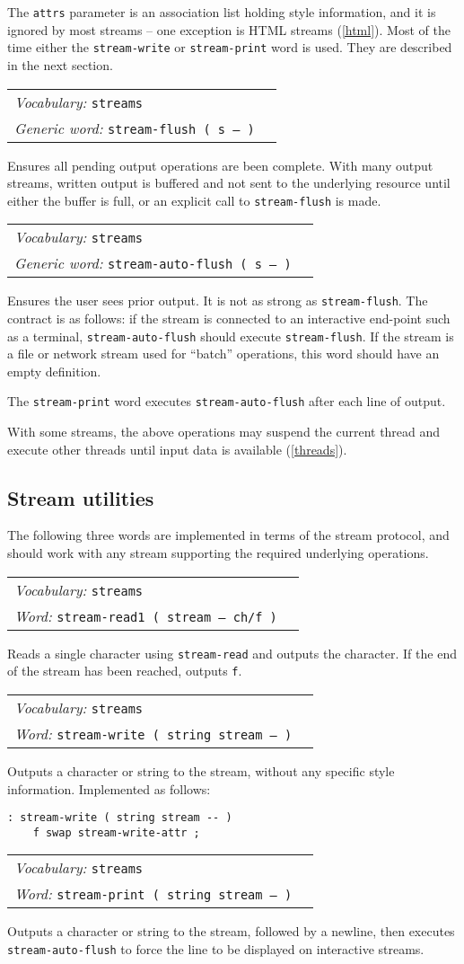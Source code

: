 \documentclass{book}
\newcommand{\vocabulary}[1]{\emph{Vocabulary:} \texttt{#1}&\\}
\newcommand{\ordinaryword}[2]{\index{\texttt{#1}}\emph{Word:} \texttt{#2}&\\}
\newcommand{\genericword}[2]{\index{\texttt{#1}}\emph{Generic word:} \texttt{#2}&\\}
\newcommand{\wordtable}[1]{

\begin{tabularx}{12cm}[t]{lX}
\hline
#1
\hline
\end{tabularx}

}
\begin{document}
The \texttt{attrs} parameter is an association list holding style information, and it is ignored by most streams -- one exception is HTML streams (\ref{html}). Most of the time either the \texttt{stream-write} or \texttt{stream-print} word is used. They are described in the next section.

\wordtable{
\vocabulary{streams}
\genericword{stream-flush}{stream-flush ( s -- )}
}
Ensures all pending output operations are been complete. With many output streams, written output is buffered and not sent to the underlying resource until either the buffer is full, or an explicit call to \texttt{stream-flush} is made.

\wordtable{
\vocabulary{streams}
\genericword{stream-auto-flush}{stream-auto-flush ( s -- )}
}
Ensures the user sees prior output. It is not as strong as \texttt{stream-flush}. The contract is as follows: if the stream is connected to an interactive end-point such as a terminal, \texttt{stream-auto-flush} should execute \texttt{stream-flush}. If the stream is a file or network stream used for ``batch'' operations, this word should have an empty definition.

The \texttt{stream-print} word executes \texttt{stream-auto-flush} after each line of output.

With some streams, the above operations may suspend the current thread and execute other threads until input data is available (\ref{threads}).

\subsection{Stream utilities}

The following three words are implemented in terms of the stream protocol, and should work with any stream supporting the required underlying operations.
\wordtable{
\vocabulary{streams}
\ordinaryword{stream-read1}{stream-read1 ( stream -- ch/f )}

}
Reads a single character using \texttt{stream-read} and outputs the character. If the end of the stream has been reached, outputs \texttt{f}.
\wordtable{
\vocabulary{streams}
\ordinaryword{stream-write}{stream-write ( string stream -- )}

}
Outputs a character or string to the stream, without any specific style information. Implemented as follows:
\begin{verbatim}
: stream-write ( string stream -- )
    f swap stream-write-attr ;
\end{verbatim}
\wordtable{
\vocabulary{streams}
\ordinaryword{stream-print}{stream-print ( string stream -- )}

}
Outputs a character or string to the stream, followed by a newline, then executes \texttt{stream-auto-flush} to force the line to be displayed on interactive streams.
\end{document}

